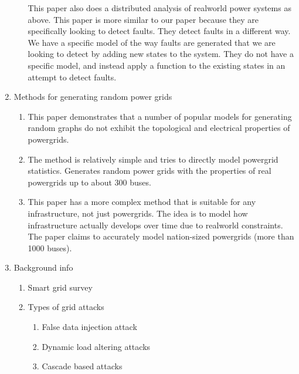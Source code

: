 \documentclass{article}
\begin{document}
\begin{enumerate}
\begin{enumerate}
This paper also does a distributed analysis of realworld power systems as above.
This paper is more similar to our paper because they are specifically looking to detect faults.
They detect faults in a different way.
We have a specific model of the way faults are generated that we are looking to detect by adding new states to the system.
They do not have a specific model, and instead apply a function to the existing states in an attempt to detect faults.
\cite{rigatos2013distributed}
\end{enumerate}

\item
Methods for generating random power grids
\begin{enumerate}
\item
This paper demonstrates that a number of popular models for generating random graphs do not exhibit the topological and electrical properties of powergrids.
\cite{hines2010topological}

\item
The method is relatively simple and tries to directly model powergrid statistics.
Generates random power grids with the properties of real powergrids up to about 300 buses.
\cite{wang2010generating}

\item
This paper has a more complex method that is suitable for any infrastructure, not just powergrids.
The idea is to model how infrastructure actually develops over time due to realworld constraints.
The paper claims to accurately model nation-sized powergrids (more than 1000 buses).
\cite{schultz2014random}
\end{enumerate}

\item
Background info
\begin{enumerate}
\item Smart grid survey
\cite{fang2012smart}

\item
Types of grid attacks
\begin{enumerate}
\item
False data injection attack
\cite{yang2013false}

\item
Dynamic load altering attacks
\cite{amini2015dynamic,amini2015detecting}

\item
Cascade based attacks
\cite{wang2009cascade,rosas2007topological,albert2004structural}
\end{enumerate}
\end{enumerate}
\end{enumerate}



\end{document}
